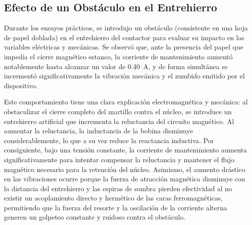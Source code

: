 \subsection{Efecto de un Obstáculo en el Entrehierro}
Durante los ensayos prácticos, se introdujo un obstáculo (consistente en una hoja de papel doblada) en el entrehierro del contactor para evaluar su impacto en las variables eléctricas y mecánicas. Se observó que, ante la presencia del papel que impedía el cierre magnético estanco, la corriente de mantenimiento aumentó notablemente hasta alcanzar un valor de \qty{0,40}{\ampere}, y de forma simultánea se incrementó significativamente la vibración mecánica y el zumbido emitido por el dispositivo.

Este comportamiento tiene una clara explicación electromagnética y mecánica: al obstaculizar el cierre completo del martillo contra el núcleo, se introduce un entrehierro artificial que incrementa la reluctancia del circuito magnético. Al aumentar la reluctancia, la inductancia de la bobina disminuye considerablemente, lo que a su vez reduce la reactancia inductiva. Por consiguiente, bajo una tensión constante, la corriente de mantenimiento aumenta significativamente para intentar compensar la reluctancia y mantener el flujo magnético necesario para la retención del núcleo. Asimismo, el aumento drástico en las vibraciones ocurre porque la fuerza de atracción magnética disminuye con la distancia del entrehierro y las espiras de sombra pierden efectividad al no existir un acoplamiento directo y hermético de las caras ferromagnéticas, permitiendo que la fuerza del resorte y la oscilación de la corriente alterna generen un golpeteo constante y ruidoso contra el obstáculo.

